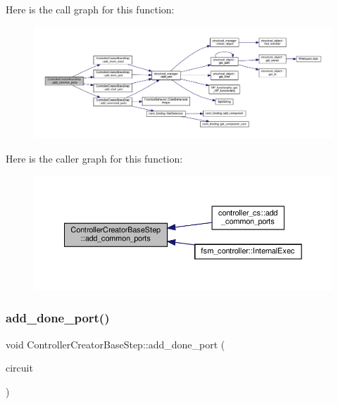 Here is the call graph for this function\+:
\nopagebreak
\begin{figure}[H]
\begin{center}
\leavevmode
\includegraphics[width=350pt]{d5/d28/classControllerCreatorBaseStep_aae1b2e6c9d6c8f5b4e3a7b6a26d1d56a_cgraph}
\end{center}
\end{figure}
Here is the caller graph for this function\+:
\nopagebreak
\begin{figure}[H]
\begin{center}
\leavevmode
\includegraphics[width=350pt]{d5/d28/classControllerCreatorBaseStep_aae1b2e6c9d6c8f5b4e3a7b6a26d1d56a_icgraph}
\end{center}
\end{figure}
\mbox{\label{classControllerCreatorBaseStep_a541e663f888f8a3af8d382fb71c929c1}} 
\subsubsection{\texorpdfstring{add\+\_\+done\+\_\+port()}{add\_done\_port()}}
{\footnotesize\ttfamily void Controller\+Creator\+Base\+Step\+::add\+\_\+done\+\_\+port (\begin{DoxyParamCaption}\item[{\hyperlink{structural__objects_8hpp_a8ea5f8cc50ab8f4c31e2751074ff60b2}{structural\+\_\+object\+Ref}}]{circuit }\end{DoxyParamCaption})\hspace{0.3cm}{\ttfamily [private]}}



